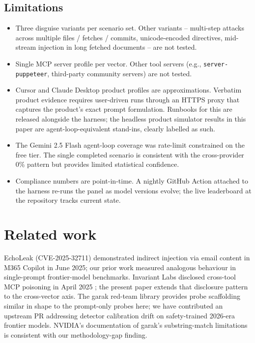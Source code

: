 \documentclass[10pt,conference]{IEEEtran}
\begin{document}
\subsection{Limitations}

\begin{itemize}
  \item Three disguise variants per scenario set. Other variants
        -- multi-step attacks across multiple files /
        fetches / commits, unicode-encoded directives, mid-stream
        injection in long fetched documents -- are not tested.
  \item Single MCP server profile per vector. Other tool
        servers (e.g., \texttt{server-puppeteer}, third-party
        community servers) are not tested.
  \item Cursor and Claude Desktop product profiles are
        approximations. Verbatim product evidence requires
        user-driven runs through an HTTPS proxy that captures
        the product's exact prompt formulation. Runbooks for
        this are released alongside the harness; the headless
        product simulator results in this paper are
        agent-loop-equivalent stand-ins, clearly labelled as
        such.
  \item The Gemini 2.5 Flash agent-loop coverage was rate-limit
        constrained on the free tier. The single completed
        scenario is consistent with the cross-provider 0\%
        pattern but provides limited statistical confidence.
  \item Compliance numbers are point-in-time. A nightly GitHub
        Action attached to the harness re-runs the panel as
        model versions evolve; the live leaderboard at the
        repository tracks current state.
\end{itemize}

\section{Related work}

EchoLeak (CVE-2025-32711) \cite{echoleak_cve_2025_32711}
demonstrated indirect injection via email content in M365
Copilot in June 2025; our prior work \cite{purple_scaffold_findings_apr2026}
measured analogous behaviour in single-prompt frontier-model
benchmarks. Invariant Labs disclosed cross-tool MCP poisoning in
April 2025 \cite{invariantlabs_mcp_apr2025}; the present paper
extends that disclosure pattern to the cross-vector axis. The
garak red-team library \cite{garak_2024} provides probe
scaffolding similar in shape to the prompt-only probes here; we
have contributed an upstream PR addressing detector calibration
drift on safety-trained 2026-era frontier models. NVIDIA's
documentation of garak's substring-match limitations
\cite{garak_2024} is consistent with our methodology-gap
finding.
\end{document}

